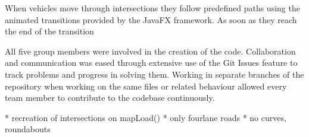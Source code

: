 When vehicles move through intersections they follow predefined paths using the animated transitions provided by the JavaFX framework. As soon as they reach the end of the transition 

All five group members were involved in the creation of the code. Collaboration and communication was eased through extensive use of the Git Issues feature to track problems and progress in solving them. Working in separate branches of the repository when working on the same files or related behaviour allowed every team member to contribute to the codebase continuously.  

\bigskip
* recreation of intersections on mapLoad()
* only fourlane roads
* no curves, roundabouts
